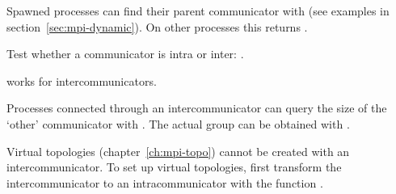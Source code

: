 Spawned processes can find their parent communicator with
(see examples in section~\ref{sec:mpi-dynamic}).
On other processes this returns .

Test whether a communicator is intra or inter:
.

 works for intercommunicators.

Processes connected through an intercommunicator can query
the size of the `other' communicator with
.
The actual group can be obtained with
.

Virtual topologies (chapter~\ref{ch:mpi-topo}) cannot be created with an intercommunicator.
To set up virtual topologies, first transform the intercommunicator to an
intracommunicator with the function
.

